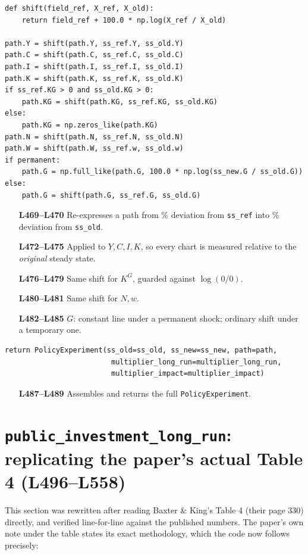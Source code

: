 \documentclass[11pt]{article}
\begin{document}
\begin{lstlisting}[firstnumber=469]
def shift(field_ref, X_ref, X_old):
    return field_ref + 100.0 * np.log(X_ref / X_old)

path.Y = shift(path.Y, ss_ref.Y, ss_old.Y)
path.C = shift(path.C, ss_ref.C, ss_old.C)
path.I = shift(path.I, ss_ref.I, ss_old.I)
path.K = shift(path.K, ss_ref.K, ss_old.K)
if ss_ref.KG > 0 and ss_old.KG > 0:
    path.KG = shift(path.KG, ss_ref.KG, ss_old.KG)
else:
    path.KG = np.zeros_like(path.KG)
path.N = shift(path.N, ss_ref.N, ss_old.N)
path.W = shift(path.W, ss_ref.w, ss_old.w)
if permanent:
    path.G = np.full_like(path.G, 100.0 * np.log(ss_new.G / ss_old.G))
else:
    path.G = shift(path.G, ss_ref.G, ss_old.G)
\end{lstlisting}
\begin{itemize}
\item[\textbf{L469--L470}] Re-expresses a path from \% deviation from
\texttt{ss\_ref} into \% deviation from \texttt{ss\_old}.
\item[\textbf{L472--L475}] Applied to $Y,C,I,K$, so every chart is measured
relative to the \emph{original} steady state.
\item[\textbf{L476--L479}] Same shift for $K^G$, guarded against
$\log(0/0)$.
\item[\textbf{L480--L481}] Same shift for $N,w$.
\item[\textbf{L482--L485}] $G$: constant line under a permanent shock;
ordinary shift under a temporary one.
\end{itemize}

\begin{lstlisting}[firstnumber=487]
return PolicyExperiment(ss_old=ss_old, ss_new=ss_new, path=path,
                         multiplier_long_run=multiplier_long_run,
                         multiplier_impact=multiplier_impact)
\end{lstlisting}
\begin{itemize}
\item[\textbf{L487--L489}] Assembles and returns the full
\texttt{PolicyExperiment}.
\end{itemize}

\section{\texttt{public\_investment\_long\_run}: replicating the paper's actual Table 4 (L496--L558)}
\label{sec:table4}

This section was rewritten after reading Baxter \& King's Table 4 (their
page 330) directly, and verified line-for-line against the published
numbers. The paper's own note under the table states its exact
methodology, which the code now follows precisely:
\end{document}
